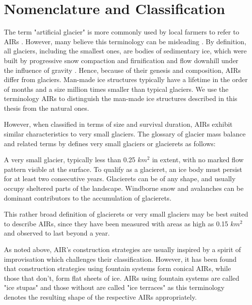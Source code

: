 \section{Nomenclature and Classification}

The term "artificial glacier" is more commonly used by local farmers to refer to \ac{AIRs}
\citep{norphelArtificialGlacierHigh2009}. However, many believe this terminology can be misleading
\citep{nusserSociohydrologyArtificialGlaciers2019}. By definition, all glaciers, including the smallest ones,
are bodies of sedimentary ice, which were built by progressive snow compaction and firnification and flow
downhill under the influence of gravity \citep{benndouglasGlaciersGlaciation2014}. Hence, because of their
genesis and composition, \ac{AIRs} differ from glaciers. Man-made ice structures typically have a lifetime in
the order of months and a size million times smaller than typical glaciers. We use the terminology \ac{AIRs} to
distinguish the man-made ice structures described in this thesis from the natural ones.

However, when classified in terms of size and survival duration, \ac{AIRs} exhibit similar characteristics to
very small glaciers. The glossary of glacier mass balance and related terms by
\citet{cogleyGlossaryGlacierMass2010} defines very small glaciers or glacierets as follows:

\begin{thesis_quotation}
	A very small glacier, typically less than 0.25 $km^2$ in extent, with no marked flow pattern
	visible at the surface. To qualify as a glacieret, an ice body must persist for at least two consecutive
	years. Glacierets can be of any shape, and usually occupy sheltered parts of the landscape. Windborne snow and
	avalanches can be dominant contributors to the accumulation of glacierets.
\end{thesis_quotation}

This rather broad definition of glacierets or very small glaciers may be best suited to describe AIRs, since
they have been measured with areas as high as 0.15 $km^2$ \citep{nusserSociohydrologyArtificialGlaciers2019} and
observed to last beyond a year.

As noted above, AIR's construction strategies are usually inspired by a spirit of improvisation which challenges
their classification. However, it has been found that construction strategies using fountain systems form
conical \ac{AIRs}, while those that don't, form flat sheets of ice. \ac{AIRs} using fountain systems are called
"ice stupas" and those without are called "ice terraces" as this terminology denotes the resulting shape of the
respective \ac{AIRs} appropriately.

